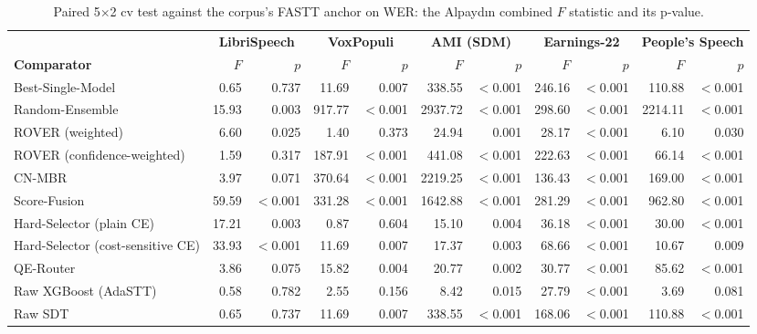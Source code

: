 \begin{table}[t]
    \centering
    \caption{Paired 5$\times$2 cv test against the corpus's FASTT anchor on WER: the Alpaydın combined $F$ statistic and its p-value.}
    \label{tab:sig_wer} \footnotesize \setlength{\tabcolsep}{3pt}
    \begin{adjustbox}{max width=\linewidth}
    \begin{tabular}{lrrrrrrrrrr}
        \toprule
         & \multicolumn{2}{c}{\textbf{LibriSpeech}} & \multicolumn{2}{c}{\textbf{VoxPopuli}} & \multicolumn{2}{c}{\textbf{AMI (SDM)}} & \multicolumn{2}{c}{\textbf{Earnings-22}} & \multicolumn{2}{c}{\textbf{People's Speech}} \\ \cmidrule(lr){2-3} \cmidrule(lr){4-5} \cmidrule(lr){6-7} \cmidrule(lr){8-9} \cmidrule(lr){10-11}
    \textbf{Comparator} & $F$ & $p$ & $F$ & $p$ & $F$ & $p$ & $F$ & $p$ & $F$ & $p$ \\
        \midrule
        Best-Single-Model & 0.65 & 0.737 & 11.69 & 0.007 & 338.55 & $<$0.001 & 246.16 & $<$0.001 & 110.88 & $<$0.001 \\
        \midrule
        Random-Ensemble & 15.93 & 0.003 & 917.77 & $<$0.001 & 2937.72 & $<$0.001 & 298.60 & $<$0.001 & 2214.11 & $<$0.001 \\
        ROVER (weighted) & 6.60 & 0.025 & 1.40 & 0.373 & 24.94 & 0.001 & 28.17 & $<$0.001 & 6.10 & 0.030 \\
        ROVER (confidence-weighted) & 1.59 & 0.317 & 187.91 & $<$0.001 & 441.08 & $<$0.001 & 222.63 & $<$0.001 & 66.14 & $<$0.001 \\
        CN-MBR & 3.97 & 0.071 & 370.64 & $<$0.001 & 2219.25 & $<$0.001 & 136.43 & $<$0.001 & 169.00 & $<$0.001 \\
        Score-Fusion & 59.59 & $<$0.001 & 331.28 & $<$0.001 & 1642.88 & $<$0.001 & 281.29 & $<$0.001 & 962.80 & $<$0.001 \\
        Hard-Selector (plain CE) & 17.21 & 0.003 & 0.87 & 0.604 & 15.10 & 0.004 & 36.18 & $<$0.001 & 30.00 & $<$0.001 \\
        Hard-Selector (cost-sensitive CE) & 33.93 & $<$0.001 & 11.69 & 0.007 & 17.37 & 0.003 & 68.66 & $<$0.001 & 10.67 & 0.009 \\
        QE-Router & 3.86 & 0.075 & 15.82 & 0.004 & 20.77 & 0.002 & 30.77 & $<$0.001 & 85.62 & $<$0.001 \\
        \midrule
        Raw XGBoost (AdaSTT) & 0.58 & 0.782 & 2.55 & 0.156 & 8.42 & 0.015 & 27.79 & $<$0.001 & 3.69 & 0.081 \\
        Raw SDT & 0.65 & 0.737 & 11.69 & 0.007 & 338.55 & $<$0.001 & 168.06 & $<$0.001 & 110.88 & $<$0.001 \\

\end{tabular}
\end{adjustbox}
\end{table}
